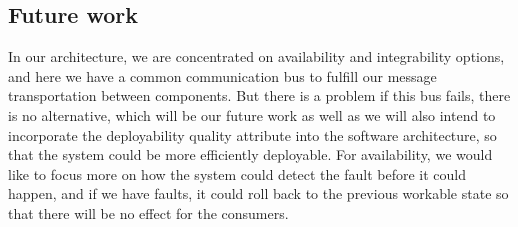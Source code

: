 \subsection{Future work}
\label{sec:future_work}

In our architecture, we are concentrated on availability and integrability options, and here we have a common communication bus to fulfill our message transportation between components. But there is a problem if this bus fails, there is no alternative, which will be our future work as well as we will also intend to incorporate the deployability quality attribute into the software architecture, so that the system could be more efficiently deployable. For availability, we would like to focus more on how the system could detect the fault before it could happen, and if we have faults, it could roll back to the previous workable state so that there will be no effect for the consumers. 
